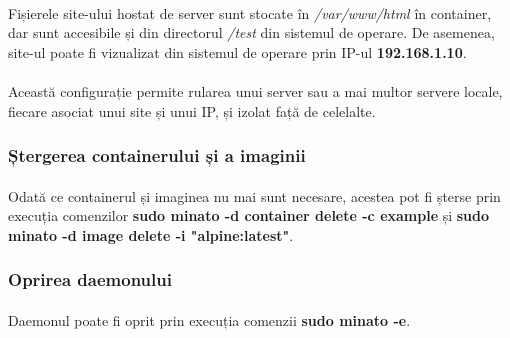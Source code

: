         \paragraph{} Fișierele site-ului hostat de server sunt stocate în \textit{/var/www/html} în container, dar sunt accesibile și din directorul \textit{/test} din sistemul de operare. De asemenea, site-ul poate fi vizualizat din sistemul de operare prin IP-ul \textbf{192.168.1.10}.
        \paragraph{} Această configurație permite rularea unui server sau a mai multor servere locale, fiecare asociat unui site și unui IP, și izolat față de celelalte.

    \subsubsection{Ștergerea containerului și a imaginii}
        \paragraph{} Odată ce containerul și imaginea nu mai sunt necesare, acestea pot fi șterse prin execuția comenzilor \textbf{sudo minato -d container delete -c example} și \textbf{sudo minato -d image delete -i "alpine:latest"}.

    \subsubsection{Oprirea daemonului}
        \paragraph{} Daemonul poate fi oprit prin execuția comenzii \textbf{sudo minato -e}.
